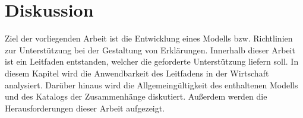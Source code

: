 \chapter{Diskussion}

Ziel der vorliegenden Arbeit ist die Entwicklung eines Modells bzw. Richtlinien zur Unterstützung bei der Gestaltung von Erklärungen. Innerhalb dieser Arbeit ist ein Leitfaden entstanden, welcher die geforderte Unterstützung liefern soll. In diesem Kapitel wird die Anwendbarkeit des Leitfadens in der Wirtschaft analysiert. Darüber hinaus wird die Allgemeingültigkeit des enthaltenen Modells und des Katalogs der Zusammenhänge diskutiert. Außerdem werden die Herausforderungen dieser Arbeit aufgezeigt.





